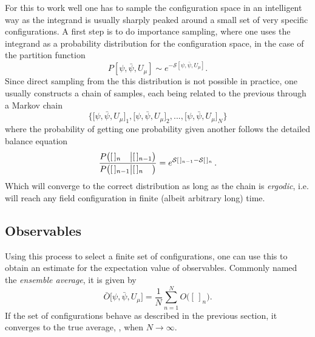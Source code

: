 For this to work well one has to sample the configuration space in an
intelligent way as the integrand is usually sharply peaked around a small set of
very specific configurations. A first step is to do importance sampling, where
one uses the integrand as a probability distribution for the configuration
space, in the case of the partition function
%
\begin{equation}
  P[\psi,\bar{\psi}, U_{\mu}] \sim e^{-\mathcal{S}[\psi,\bar{\psi}, U_{\mu}]}.
\end{equation}
%
Since direct sampling from the this distribution is not possible in practice,
one usually constructs a chain of samples, each being related to the previous
through a Markov chain
%
\begin{equation}
  \Big\{
    \big[\psi, \bar{\psi}, U_{\mu}\big]_1, 
    \big[\psi, \bar{\psi}, U_{\mu}\big]_2, ..., 
    \big[\psi, \bar{\psi}, U_{\mu}\big]_N
  \Big\}
\end{equation}
%
where the probability of getting one probability given another follows the
detailed balance equation
%
\begin{equation}
  \frac{%
    P\big([\,]_{n\hphantom{-1}} \big| [\,]_{n-1}\big)
  }{%
    P\big([\,]_{n-1} \big| [\,]_{n\hphantom{-1}}\big)
  } = e^{\mathcal{S}[\,]_{n-1} - \mathcal{S}[\,]_n} \,.
\end{equation}
%
Which will converge to the correct distribution as long as the chain is
\emph{ergodic}, i.e. will reach any field configuration in finite (albeit
arbitrary long) time.

\subsection{Observables}

Using this process to select a finite set of configurations, one can use this to
obtain an estimate for the expectation value of observables. 
Commonly named the \emph{ensemble average}, it is given by
%
\begin{equation}
  \bar{O}\big[\psi, \bar{\psi}, U_{\mu}\big] = \frac{1}{N} \sum_{n = 1}^N O\big( [\,]_n \big).
\end{equation}
%
If the set of configurations behave as described in the previous section, it
converges to the true average, , when $N \to
\infty$.

